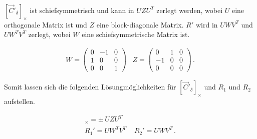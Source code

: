 %

$[\overrightarrow{C}'_\delta]_\times$ ist schiefsymmetrisch und kann in $UZU^T$ zerlegt werden, wobei $U$ eine orthogonale Matrix ist und $Z$ eine block-diagonale Matrix\cite{HZ}. $R'$ wird in $UWV^T$ und $UW^TV^T$ zerlegt, wobei $W$ eine schiefsymmetrische Matrix ist\cite{Ferid,HZ,phdextrinsicPara}.%



\begin{gather}
W = \begin{pmatrix}
0&-1&0\\
1&0&0\\
0&0&1
\end{pmatrix} \;\;\;
Z=
\begin{pmatrix}
0&1&0\\
-1&0&0\\
0&0&0
\end{pmatrix} \, .
\end{gather}


Somit lassen sich die folgenden Lösungmöglichkeiten für $[\overrightarrow{C}'_\delta]_\times$ und $R_1$ und $R_2$ aufstellen\cite{HZ,Ferid}.


\begin{gather}
[\overrightarrow{C}'_\delta]_\times = \pm \,UZU^T \\
R_1' = UW^TV^T \;\;\;\; R_2' = UWV^T \, .
\end{gather}\\



